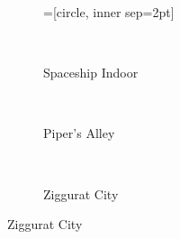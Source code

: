 \begin{figure}[t]
  \hspace{0.05\textwidth}%
  \begin{subfigure}[b]{\textwidth}
  =[circle, inner sep=2pt]
    
  \end{subfigure}\hfill\\
  \begin{minipage}[t]{0.5\textwidth}
  \begin{adjustbox}{minipage=\textwidth, scale=0.55}
    \begin{subfigure}[b]{1.6\textwidth}
      \centering
      \def\svgwidth{\textwidth}
      
      \caption{Spaceship Indoor}
      \vspace{4pt}
      \label{fig:fds-test-lights:indoor}
    \end{subfigure}
  \end{adjustbox} \\
  \begin{adjustbox}{minipage=\textwidth, scale=0.55}
    \begin{subfigure}[b]{1.6\textwidth}
      \centering
      \def\svgwidth{\textwidth}
      
      \caption{Piper's Alley}
      \vspace{4pt}
      \label{fig:fds-test-lights:alley}
    \end{subfigure}
  \end{adjustbox} \\
  \begin{adjustbox}{minipage=\textwidth, scale=0.55}
    \begin{subfigure}[b]{1.6\textwidth}
      \centering
      \def\svgwidth{\textwidth}
      
      \caption{Ziggurat City}
      \label{fig:fds-test-lights:city}
    \end{subfigure}
  \end{adjustbox}

\end{minipage}
\end{figure}
